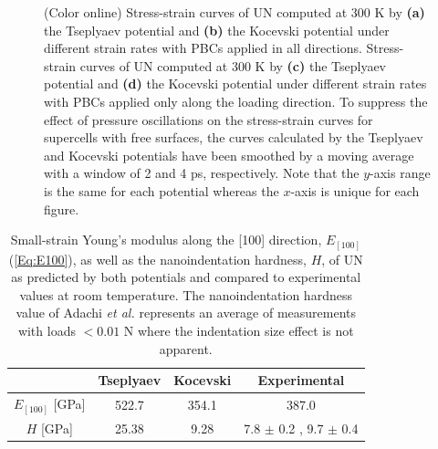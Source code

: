 \documentclass[applsci,article,submit,pdftex,moreauthors]{Definitions/mdpi}
\newcommand{\?}{\stackrel{?}{=}}
\begin{document}
\begin{figure}[h!]
\caption{(Color online) Stress-strain curves of UN computed at 300 K by \textbf{(a)} the Tseplyaev potential and \textbf{(b)} the Kocevski potential under different strain rates with PBCs applied in all directions. Stress-strain curves of UN computed at 300 K by \textbf{(c)} the Tseplyaev potential and \textbf{(d)} the Kocevski potential under different strain rates with PBCs applied only along the loading direction. To suppress the effect of pressure oscillations on the stress-strain curves for supercells with free surfaces, the curves calculated by the Tseplyaev and Kocevski potentials have been smoothed by a moving average with a window of 2 and 4 ps, respectively. Note that the $y$-axis range is the same for each potential whereas the $x$-axis is unique for each figure.}
\label{Fig:SS}
\end{figure}

\begin{table}[h!]
\centering
\caption{Small-strain Young's modulus along the [100] direction, $E_{[100]}$ (\cref{Eq:E100}), as well as the nanoindentation hardness, $H$, of UN as predicted by both potentials and compared to experimental values at room temperature. The nanoindentation hardness value of Adachi \textit{et al.} \cite{Adachi2009} represents an average of measurements with loads $< 0.01$ N where the indentation size effect is not apparent.}
\footnotesize
\begin{tabular}{cccc} 
\hline
                    & Tseplyaev     & Kocevski  & Experimental \\
\hline
$E_{[100]}$ [GPa]   & 522.7         & 354.1     & 387.0 \cite{Salleh1986}   \\
$H$ [GPa]           & 25.38         & 9.28      & 7.8 $\pm$ 0.2 \cite{Frazer2021}, 9.7 $\pm$ 0.4 \cite{Adachi2009}    \\
\hline
\end{tabular}
\label{Tab:E100}
\end{table}

\end{document}
